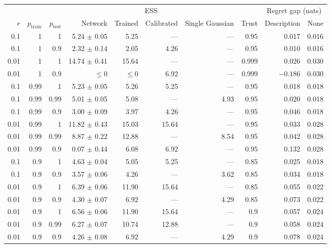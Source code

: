 \begin{tabular}{rrrrrrrrrr}
\toprule
& & & \multicolumn{4}{c}{ESS} & & \multicolumn{2}{c}{Regret gap (nats)} \\
\cmidrule(lr){4-7}\cmidrule(lr){9-10}
$r$ & $p_{\mathrm{train}}$ & $p_{\mathrm{test}}$ & Network & Trained & Calibrated & Single Gaussian & Trust & Description & None \\
\midrule
0.1 & 1 & 1 & 5.24 $\pm$ 0.05 & 5.25 & --- & --- & 0.95 & 0.017 & 0.016 \\
0.1 & 1 & 0.9 & 2.32 $\pm$ 0.14 & 2.05 & 4.26 & --- & 0.95 & 0.010 & 0.016 \\
0.01 & 1 & 1 & 14.74 $\pm$ 0.41 & 15.64 & --- & --- & 0.999 & 0.026 & 0.030 \\
0.01 & 1 & 0.9 & $\le 0$ & $\le 0$ & 6.92 & --- & 0.999 & $-0.186$ & 0.030 \\
0.1 & 0.99 & 1 & 5.23 $\pm$ 0.05 & 5.26 & 5.25 & --- & 0.95 & 0.018 & 0.018 \\
0.1 & 0.99 & 0.99 & 5.01 $\pm$ 0.05 & 5.08 & --- & 4.93 & 0.95 & 0.020 & 0.018 \\
0.1 & 0.99 & 0.9 & 3.00 $\pm$ 0.09 & 3.97 & 4.26 & --- & 0.95 & 0.046 & 0.018 \\
0.01 & 0.99 & 1 & 11.82 $\pm$ 0.43 & 15.03 & 15.64 & --- & 0.95 & 0.033 & 0.028 \\
0.01 & 0.99 & 0.99 & 8.87 $\pm$ 0.22 & 12.88 & --- & 8.54 & 0.95 & 0.042 & 0.028 \\
0.01 & 0.99 & 0.9 & 0.07 $\pm$ 0.44 & 6.08 & 6.92 & --- & 0.95 & 0.132 & 0.028 \\
0.1 & 0.9 & 1 & 4.63 $\pm$ 0.04 & 5.05 & 5.25 & --- & 0.85 & 0.025 & 0.018 \\
0.1 & 0.9 & 0.9 & 3.57 $\pm$ 0.06 & 4.26 & --- & 3.62 & 0.85 & 0.034 & 0.018 \\
0.01 & 0.9 & 1 & 6.39 $\pm$ 0.06 & 11.90 & 15.64 & --- & 0.85 & 0.055 & 0.022 \\
0.01 & 0.9 & 0.9 & 4.30 $\pm$ 0.07 & 6.92 & --- & 4.29 & 0.85 & 0.073 & 0.022 \\
0.01 & 0.9 & 1 & 6.56 $\pm$ 0.06 & 11.90 & 15.64 & --- & 0.9 & 0.057 & 0.024 \\
0.01 & 0.9 & 0.99 & 6.27 $\pm$ 0.07 & 10.74 & 12.88 & --- & 0.9 & 0.058 & 0.024 \\
0.01 & 0.9 & 0.9 & 4.26 $\pm$ 0.08 & 6.92 & --- & 4.29 & 0.9 & 0.078 & 0.024 \\
\bottomrule
\end{tabular}
